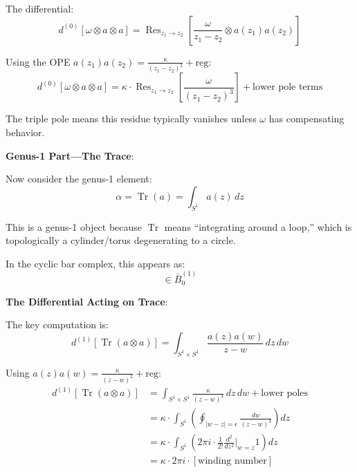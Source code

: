The differential:
\begin{equation}
d^{(0)}[\omega \otimes a \otimes a] = \operatorname{Res}_{z_1 \to z_2} \left[ \frac{\omega}{z_1 - z_2} \otimes a(z_1) a(z_2) \right]
\end{equation}

Using the OPE $a(z_1)a(z_2) = \frac{\kappa}{(z_1-z_2)^2} + \text{reg}$:
\begin{equation}
d^{(0)}[\omega \otimes a \otimes a] = \kappa \cdot \operatorname{Res}_{z_1 \to z_2} \left[ \frac{\omega}{(z_1-z_2)^3} \right] + \text{lower pole terms}
\end{equation}

The triple pole means this residue typically vanishes unless $\omega$ has compensating behavior.

\textbf{Genus-1 Part---The Trace}:

Now consider the genus-1 element:
\begin{equation}
\alpha = \operatorname{Tr}(a) = \int_{S^1} a(z) \, dz
\end{equation}

This is a genus-1 object because $\operatorname{Tr}$ means ``integrating around a loop,'' which is topologically a cylinder/torus degenerating to a circle.

In the cyclic bar complex, this appears as:
\begin{equation}
[\operatorname{Tr}(a)] \in \bar{B}^{(1)}_0
\end{equation}

\textbf{The Differential Acting on Trace}:

The key computation is:
\begin{equation}
d^{(1)}[\operatorname{Tr}(a \otimes a)] = \int_{S^1 \times S^1} \frac{a(z) a(w)}{z - w} \, dz \, dw
\end{equation}

Using $a(z)a(w) = \frac{\kappa}{(z-w)^2} + \text{reg}$:
\begin{align}
d^{(1)}[\operatorname{Tr}(a \otimes a)] &= \int_{S^1 \times S^1} \frac{\kappa}{(z-w)^3} \, dz \, dw + \text{lower poles}\\
&= \kappa \cdot \int_{S^1} \left( \oint_{|w-z|=\epsilon} \frac{dw}{(z-w)^3} \right) dz\\
&= \kappa \cdot \int_{S^1} \left( 2\pi i \cdot \frac{1}{2!} \frac{d^2}{dz^2}|_{w=z} 1 \right) dz\\
&= \kappa \cdot 2\pi i \cdot [\text{winding number}]
\end{align}

